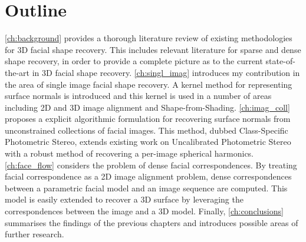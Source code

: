 \section{Outline}\label{sec:introduction_outline}
\cref{ch:background} provides a thorough literature review of existing
methodologies for 3D facial shape recovery. This includes relevant literature
for sparse and dense shape recovery, in order to provide a complete
picture as to the current state-of-the-art in 3D facial shape recovery.
\cref{ch:singl_imag} introduces my contribution in the area of single image
facial shape recovery. A kernel method for representing surface normals is 
introduced and this kernel is used in a number of areas including 2D and 3D
image alignment and Shape-from-Shading.
\cref{ch:imag_coll} proposes a explicit algorithmic formulation for recovering
surface normals from unconstrained collections of facial images. This method,
dubbed Class-Specific Photometric Stereo, extends existing work on Uncalibrated
Photometric Stereo~\cite{KemelmacherShlizerman:2013iv,basri2007photometric}
with a robust method of recovering a per-image spherical harmonics.
\cref{ch:face_flow} considers the problem of dense facial correspondences. By
treating facial correspondence as a 2D image alignment problem, dense
correspondences between a parametric facial model and an image sequence are
computed. This model is easily extended to recover a 3D surface by leveraging
the correspondences between the image and a 3D model. 
Finally, \cref{ch:conclusions} summarises the findings of the previous chapters
and introduces possible areas of further research. 
